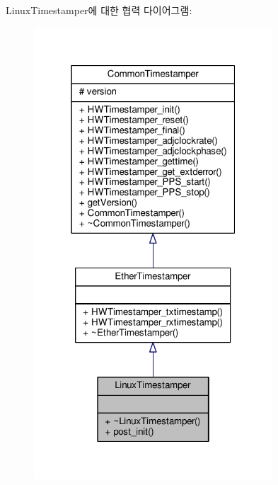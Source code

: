 Linux\+Timestamper에 대한 협력 다이어그램\+:
\nopagebreak
\begin{figure}[H]
\begin{center}
\leavevmode
\includegraphics[width=253pt]{class_linux_timestamper__coll__graph}
\end{center}
\end{figure}
